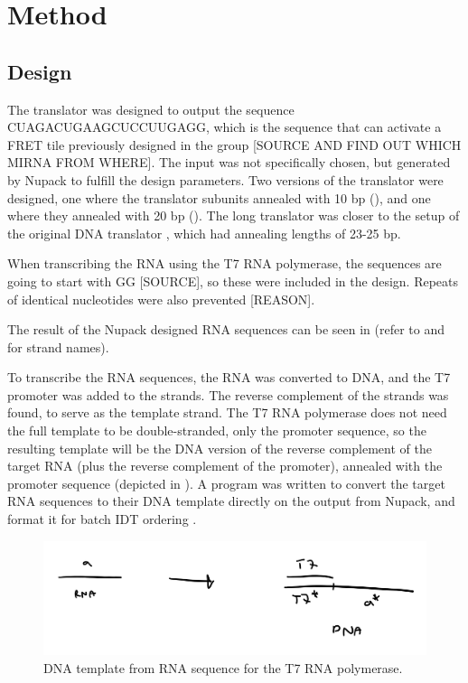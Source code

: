 \section{Method}

\subsection{Design}

The translator was designed to output the sequence CUAGACUGAAGCUCCUUGAGG, which is the sequence that can activate a FRET tile previously designed in the group [SOURCE AND FIND OUT WHICH MIRNA FROM WHERE]. The input was not specifically chosen, but generated by Nupack to fulfill the design parameters. Two versions of the translator were designed, one where the translator subunits annealed with 10 bp (), and one where they annealed with 20 bp (). The long translator was closer to the setup of the original DNA translator \cite{Picuri2009}, which had annealing lengths of 23-25 bp.

When transcribing the RNA using the T7 RNA polymerase, the sequences are going to start with GG [SOURCE], so these were included in the design. Repeats of identical nucleotides were also prevented [REASON].

The result of the Nupack designed RNA sequences can be seen in  (refer to  and  for strand names).

To transcribe the RNA sequences, the RNA was converted to DNA, and the T7 promoter was added to the strands. The reverse complement of the strands was found, to serve as the template strand. The T7 RNA polymerase does not need the full template to be double-stranded, only the promoter sequence, so the resulting template will be the DNA version of the reverse complement of the target RNA (plus the reverse complement of the promoter), annealed with the promoter sequence (depicted in ). A program was written to convert the target RNA sequences to their DNA template directly on the output from Nupack, and format it for batch IDT ordering \cite{nupackorder}.


\begin{figure}[H]
\centering
\includegraphics[width=\columnwidth]{images/rna_to_dna_process.png}
\caption{DNA template from RNA sequence for the T7 RNA polymerase.}
\label{rna_to_dna_process}
\end{figure}


